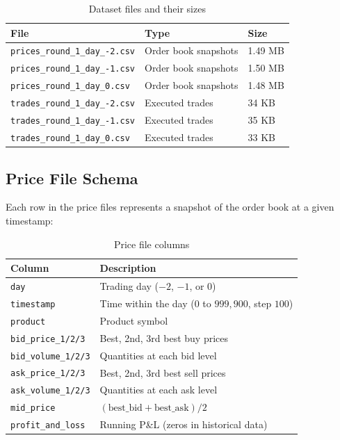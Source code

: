 \documentclass[11pt,a4paper]{article}
\begin{document}
\begin{table}[H]
\centering
\caption{Dataset files and their sizes}
\begin{tabular}{@{}lll@{}}
\toprule
\textbf{File} & \textbf{Type} & \textbf{Size} \\
\midrule
\texttt{prices\_round\_1\_day\_-2.csv} & Order book snapshots & 1.49 MB \\
\texttt{prices\_round\_1\_day\_-1.csv} & Order book snapshots & 1.50 MB \\
\texttt{prices\_round\_1\_day\_0.csv}  & Order book snapshots & 1.48 MB \\
\texttt{trades\_round\_1\_day\_-2.csv} & Executed trades      & 34 KB \\
\texttt{trades\_round\_1\_day\_-1.csv} & Executed trades      & 35 KB \\
\texttt{trades\_round\_1\_day\_0.csv}  & Executed trades      & 33 KB \\
\bottomrule
\end{tabular}
\end{table}

\subsection{Price File Schema}

Each row in the price files represents a snapshot of the order book at a given timestamp:

\begin{table}[H]
\centering
\caption{Price file columns}
\begin{tabular}{@{}ll@{}}
\toprule
\textbf{Column} & \textbf{Description} \\
\midrule
\texttt{day}              & Trading day ($-2$, $-1$, or $0$) \\
\texttt{timestamp}        & Time within the day ($0$ to $999{,}900$, step $100$) \\
\texttt{product}          & Product symbol \\
\texttt{bid\_price\_1/2/3}  & Best, 2nd, 3rd best buy prices \\
\texttt{bid\_volume\_1/2/3} & Quantities at each bid level \\
\texttt{ask\_price\_1/2/3}  & Best, 2nd, 3rd best sell prices \\
\texttt{ask\_volume\_1/2/3} & Quantities at each ask level \\
\texttt{mid\_price}        & $(\text{best\_bid} + \text{best\_ask}) / 2$ \\
\texttt{profit\_and\_loss}  & Running P\&L (zeros in historical data) \\
\bottomrule
\end{tabular}
\end{table}
\end{document}
